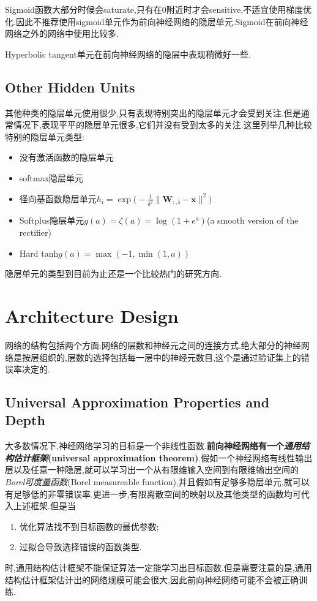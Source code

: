Sigmoid函数大部分时候会saturate,只有在$0$附近时才会sensitive,不适宜使用梯度优化.因此不推荐使用sigmoid单元作为前向神经网络的隐层单元.Sigmoid在前向神经网络之外的网络中使用比较多.

Hyperbolic tangent单元在前向神经网络的隐层中表现稍微好一些.

\subsection{Other Hidden Units}

其他种类的隐层单元使用很少,只有表现特别突出的隐层单元才会受到关注.但是通常情况下,表现平平的隐层单元很多,它们并没有受到太多的关注.这里列举几种比较特别的隐层单元类型:
\begin{itemize}
    \item 没有激活函数的隐层单元
    \item softmax隐层单元
    \item 径向基函数隐层单元$h_i=\exp\Big(-\frac{1}{\delta^2}\|\bm{W_{:,i}-x}\|^2\Big)$
    \item Softplus隐层单元$g(a)=\zeta(a)=\log(1+e^a)$(a smooth version of the rectifier)
    \item Hard tanh$g(a)=\max(-1,\min(1,a))$
\end{itemize}

隐层单元的类型到目前为止还是一个比较热门的研究方向.

\section{Architecture Design}

网络的结构包括两个方面:网络的层数和神经元之间的连接方式.绝大部分的神经网络是按层组织的,层数的选择包括每一层中的神经元数目,这个是通过验证集上的错误率决定的.

\subsection{Universal Approximation Properties and Depth}

大多数情况下,神经网络学习的目标是一个非线性函数.\textbf{前向神经网络有一个\textit{通用结构估计框架}(universal approximation theorem)}.假如一个神经网络有线性输出层以及任意一种隐层,就可以学习出一个从有限维输入空间到有限维输出空间的\textit{Borel可度量函数}(Borel measureable function),并且假如有足够多隐层单元,就可以有足够低的非零错误率.更进一步,有限离散空间的映射以及其他类型的函数均可代入上述框架.但是当
\begin{enumerate}
\item 优化算法找不到目标函数的最优参数;
\item 过拟合导致选择错误的函数类型.
\end{enumerate}
时,通用结构估计框架不能保证算法一定能学习出目标函数.但是需要注意的是,通用结构估计框架估计出的网络规模可能会很大,因此前向神经网络可能不会被正确训练.

